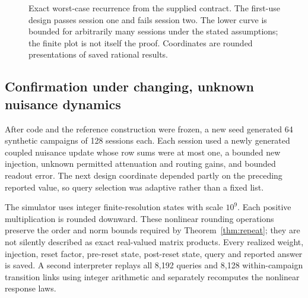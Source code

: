 \documentclass[11pt,letterpaper]{article}
\theoremstyle{definition}\newtheorem{definition}[theorem]{Definition}
\theoremstyle{remark}\newtheorem{remark}[theorem]{Remark}
\begin{document}
\begin{figure}[htbp]
\centering
{}
\caption{Exact worst-case recurrence from the supplied contract. The first-use design passes session one and fails session two. The lower curve is bounded for arbitrarily many sessions under the stated assumptions; the finite plot is not itself the proof. Coordinates are rounded presentations of saved rational results.}
\label{fig:repeat}
\end{figure}

\subsection{Confirmation under changing, unknown nuisance dynamics}
After code and the reference construction were frozen, a new seed generated 64 synthetic campaigns of 128 sessions each. Each session used a newly generated coupled nuisance update whose row sums were at most one, a bounded new injection, unknown permitted attenuation and routing gains, and bounded readout error. The next design coordinate depended partly on the preceding reported value, so query selection was adaptive rather than a fixed list.

The simulator uses integer finite-resolution states with scale $10^9$. Each positive multiplication is rounded downward. These nonlinear rounding operations preserve the order and norm bounds required by Theorem~\ref{thm:repeat}; they are not silently described as exact real-valued matrix products. Every realized weight, injection, reset factor, pre-reset state, post-reset state, query and reported answer is saved. A second interpreter replays all 8,192 queries and 8,128 within-campaign transition links using integer arithmetic and separately recomputes the nonlinear response laws.
\end{document}
